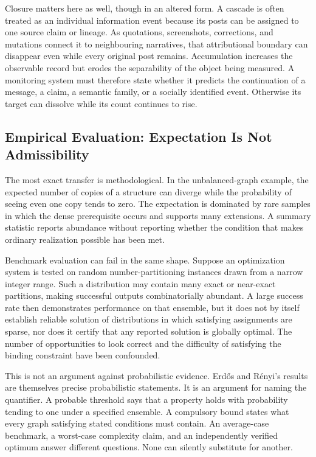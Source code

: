\documentclass[11pt]{article}
\begin{document}
Closure matters here as well, though in an altered form. A cascade is often treated as an individual information event because its posts can be assigned to one source claim or lineage. As quotations, screenshots, corrections, and mutations connect it to neighbouring narratives, that attributional boundary can disappear even while every original post remains. Accumulation increases the observable record but erodes the separability of the object being measured. A monitoring system must therefore state whether it predicts the continuation of a message, a claim, a semantic family, or a socially identified event. Otherwise its target can dissolve while its count continues to rise.

\subsection{Empirical Evaluation: Expectation Is Not Admissibility}

The most exact transfer is methodological. In the unbalanced-graph example, the expected number of copies of a structure can diverge while the probability of seeing even one copy tends to zero. The expectation is dominated by rare samples in which the dense prerequisite occurs and supports many extensions. A summary statistic reports abundance without reporting whether the condition that makes ordinary realization possible has been met.

Benchmark evaluation can fail in the same shape. Suppose an optimization system is tested on random number-partitioning instances drawn from a narrow integer range. Such a distribution may contain many exact or near-exact partitions, making successful outputs combinatorially abundant. A large success rate then demonstrates performance on that ensemble, but it does not by itself establish reliable solution of distributions in which satisfying assignments are sparse, nor does it certify that any reported solution is globally optimal. The number of opportunities to look correct and the difficulty of satisfying the binding constraint have been confounded.

This is not an argument against probabilistic evidence. Erd\H{o}s and R\'enyi's results are themselves precise probabilistic statements. It is an argument for naming the quantifier. A probable threshold says that a property holds with probability tending to one under a specified ensemble. A compulsory bound states what every graph satisfying stated conditions must contain. An average-case benchmark, a worst-case complexity claim, and an independently verified optimum answer different questions. None can silently substitute for another.
\end{document}
